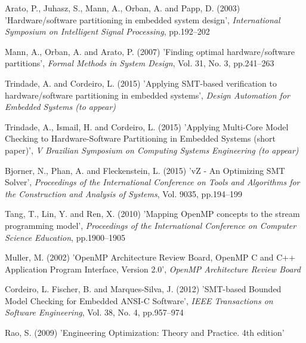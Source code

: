 \documentclass{doublecol-new}
\theoremstyle{TH}{
\newtheorem{lemma}{Lemma}
\newtheorem{theorem}[lemma]{Theorem}
\newtheorem{corrolary}[lemma]{Corrolary}
\newtheorem{conjecture}[lemma]{Conjecture}
\newtheorem{proposition}[lemma]{Proposition}
\newtheorem{claim}[lemma]{Claim}
\newtheorem{stheorem}[lemma]{Wrong Theorem}
\newtheorem{algorithm}{Algorithm}
}
\theoremstyle{THrm}{
\newtheorem{definition}{Definition}[section]
\newtheorem{question}{Question}[section]
\newtheorem{remark}{Remark}
\newtheorem{scheme}{Scheme}
}
\theoremstyle{THhit}{
\newtheorem{case}{Case}[section]
}
\begin{document}
\begin{thebibliography}{10}

Arato, P., Juhasz, S., Mann, A., Orban, A. and Papp, D. (2003) 'Hardware/software partitioning in embedded system design', {\it International Symposium on Intelligent Signal Processing}, pp.192--202

Mann, A., Orban, A. and Arato, P. (2007) 'Finding optimal hardware/software partitions', {\it Formal Methods in System Design}, Vol. 31, No. 3, pp.241--263

Trindade, A. and Cordeiro, L. (2015) 'Applying SMT-based verification to hardware/software partitioning in embedded systems', {\it Design Automation for Embedded Systems (to appear)}

Trindade, A., Ismail, H. and Cordeiro, L. (2015) 'Applying Multi-Core Model Checking to Hardware-Software Partitioning in Embedded Systems (short paper)', {\it V Brazilian Symposium on Computing Systems Engineering (to appear)}

Bjorner, N., Phan, A. and Fleckenstein, L. (2015) 'vZ - An Optimizing SMT Solver', {\it Proceedings of the International Conference on Tools and Algorithms for the Construction and Analysis of Systems}, Vol. 9035, pp.194--199

Tang, T., Lin, Y. and Ren, X. (2010) 'Mapping OpenMP concepts to the stream programming model', {\it Proceedings of the International Conference on Computer Science Education}, pp.1900--1905

Muller, M. (2002) 'OpenMP Architecture Review Board, OpenMP C and C++ Application Program Interface, Version 2.0', {\it OpenMP Architecture Review Board}

Cordeiro, L. Fischer, B. and Marques-Silva, J. (2012) 'SMT-based Bounded Model Checking for Embedded ANSI-C Software', {\it IEEE Transactions on Software Engineering}, Vol. 38, No. 4, pp.957--974

Rao, S. (2009) 'Engineering Optimization: Theory and Practice. 4th edition'


\end{thebibliography}
\end{document}
